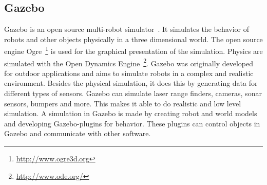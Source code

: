 \documentclass[11pt,a4paper,titlepage]{article}
\begin{document}
\subsection{Gazebo}
Gazebo is an open source multi-robot simulator~\cite{GazeboDesign}. It simulates the behavior of robots and other objects physically in a three dimensional world. The open source engine Ogre~\footnote{\url{http://www.ogre3d.org}} is used for the graphical presentation of the simulation. Physics are simulated with the Open Dynamics Engine~\footnote{\url{http://www.ode.org/}}. Gazebo was originally developed for outdoor applications and aims to simulate robots in a complex and realistic environment. Besides the physical simulation, it does this by generating data for different types of sensors. Gazebo can simulate laser range finders, cameras, sonar sensors, bumpers and more. This makes it able to do realistic and low level simulation. A simulation in Gazebo is made by creating robot and world models and developing Gazebo-plugins for behavior. These plugins can control objects in Gazebo and communicate with other software.
\end{document}
